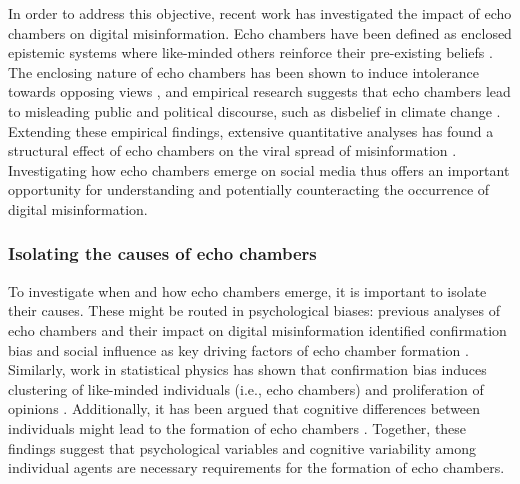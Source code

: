 \documentclass[doc,floatsintext]{apa6}
\begin{document}
In order to address this objective, recent work has investigated the impact of echo chambers on digital misinformation. Echo chambers have been defined as enclosed epistemic systems where like-minded others reinforce their  pre-existing beliefs \citep{madsen2018large}. The enclosing nature of echo chambers has been shown to induce intolerance towards opposing views \citep{takikawa2017political}, and empirical research suggests that echo chambers lead to misleading public and political discourse, such as disbelief in climate change \citep{jasny2015empirical, jasny2019echo}. Extending these empirical findings, extensive quantitative analyses has found a structural effect of echo chambers on the viral spread of misinformation \citep{tornberg2018echo, del2016spreading}. Investigating how echo chambers emerge on social media thus offers an important opportunity for understanding and potentially counteracting the occurrence of digital misinformation. 

\subsubsection{Isolating the causes of echo chambers}
To investigate when and how echo chambers emerge, it is important to isolate their causes. These might be routed in psychological biases: previous analyses of echo chambers and their impact on digital misinformation identified confirmation bias and social influence as key driving factors of echo chamber formation
\citep{del2016spreading}. Similarly, work in statistical physics has shown that confirmation bias induces clustering of like-minded individuals (i.e., echo chambers) and proliferation of opinions \citep{ngampruetikorn2016bias}. Additionally, it has been argued that cognitive differences between individuals might lead to the formation of echo chambers \citep{barkun2013culture}. Together, these findings suggest that psychological variables and cognitive variability among individual agents are necessary requirements for the formation of echo chambers. 
\end{document}
